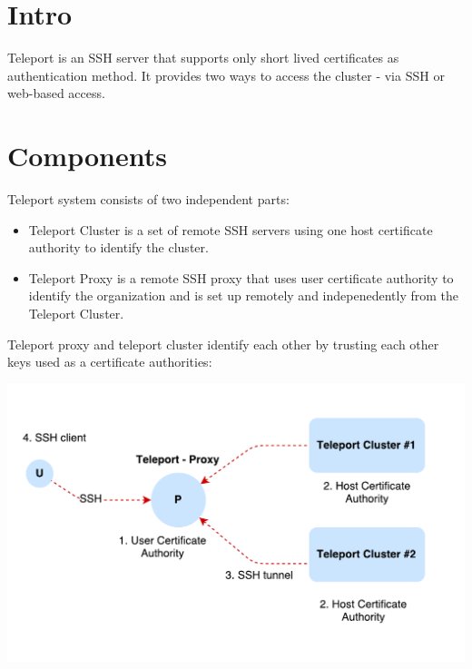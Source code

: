 \documentclass{res}
\begin{document}
 
\thispagestyle{empty} %


\begin{resume}
\vspace{0.1in}

\section{Intro}
\vspace{0.1in} 
 
   Teleport is an SSH server that supports only short lived certificates as authentication method.
   It provides two ways to access the cluster - via SSH or web-based access.

\section{Components}
\vspace{0.1in}

    Teleport system consists of two independent parts:

    \begin{itemize} %
      \item Teleport Cluster is a set of remote SSH servers using one host certificate authority to identify the cluster.
      \item Teleport Proxy is a remote SSH proxy that uses user certificate authority to identify the organization and is set up remotely and indepenedently from the Teleport Cluster.
    \end{itemize}

 
    Teleport proxy and teleport cluster identify each other by trusting each other keys used as a certificate authorities:

    \includegraphics[scale=0.8]{./images/teleport-proxy-cluster.pdf}


\end{resume}
\end{document}
